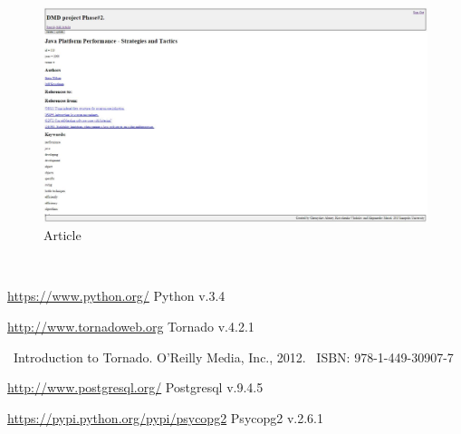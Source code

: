 \documentclass{article}
\begin{document}
~
~
\begin{figure}[h!]
  \centering
      \includegraphics[width=16cm]{4.jpg}
  \caption{Article}
\end{figure}

~
\\


\begin{thebibliography}{1}

\url{https://www.python.org/} Python v.3.4

\url{http://www.tornadoweb.org} Tornado v.4.2.1

\ Introduction to Tornado. O’Reilly Media, Inc., 2012. \ ISBN: 978-1-449-30907-7

\url{http://www.postgresql.org/} Postgresql v.9.4.5

\url{https://pypi.python.org/pypi/psycopg2} Psycopg2 v.2.6.1


\end{thebibliography}
\end{document}
